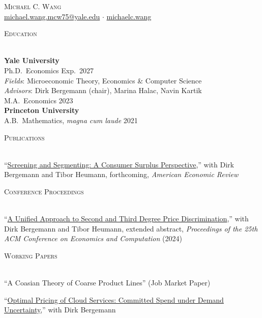 \documentclass[letterpaper,11pt]{article}
\makeatletter
\newcommand{\lineunder} {
    \vspace*{-4pt} \\
	\hrulefill \\
	\vspace{-2pt}
}
\newcommand{\cvindent}{2em}
\newcommand{\pubsep}{1.5mm}
\newcommand{\pub}[1]{%
    \par\noindent #1\par\vspace{\pubsep}
}
\newcommand{\header} [1] {
    {\vspace*{6pt} \large{\textsc{#1}}}
    \vspace*{-6pt} \lineunder
}
\newcommand{\pagehead} {
	\begin{center}
		{\Huge \textsc{Michael C. Wang}} \\[1.5mm]
		\href{mailto:michael.wang.mcw75@yale.edu}{michael.wang.mcw75@yale.edu} $\cdot$ \href{https://michaelc.wang}{michaelc.wang} \\
		\vspace*{3mm}
	\end{center}
}
\makeatother
\begin{document}

\pagehead


\header{Education}

\textbf{Yale University} \\
Ph.D.\ Economics \hfill Exp.\ 2027 \\
\hspace{\cvindent}\textit{Fields}: Microeconomic Theory, Economics \& Computer Science \\
\hspace{\cvindent}\textit{Advisors}: Dirk Bergemann (chair), Marina Halac, Navin Kartik \\[1.5mm]
M.A.\ Economics \hfill 2023 \\[3mm]

\textbf{Princeton University} \\
A.B.\ Mathematics, \textit{magna cum laude} \hfill 2021

\vspace{3mm}


\header{Publications}

\pub{``\href{https://www.aeaweb.org/articles?id=10.1257/aer.20250206}{Screening and Segmenting: A Consumer Surplus Perspective},'' with Dirk Bergemann and Tibor Heumann, forthcoming, \textit{American Economic Review}}

\vspace{2.5mm}


\header{Conference Proceedings}

\pub{``\href{https://dl.acm.org/doi/10.1145/3670865.3673626}{A Unified Approach to Second and Third Degree Price Discrimination},'' with Dirk Bergemann and Tibor Heumann, extended abstract, \textit{Proceedings of the 25th ACM Conference on Economics and Computation} (2024)}

\vspace{2.5mm}


\header{Working Papers}

\pub{``A Coasian Theory of Coarse Product Lines'' (Job Market Paper)}

\pub{``\href{https://arxiv.org/abs/2502.08022}{Optimal Pricing of Cloud Services: Committed Spend under Demand Uncertainty},'' with Dirk Bergemann}
\end{document}
